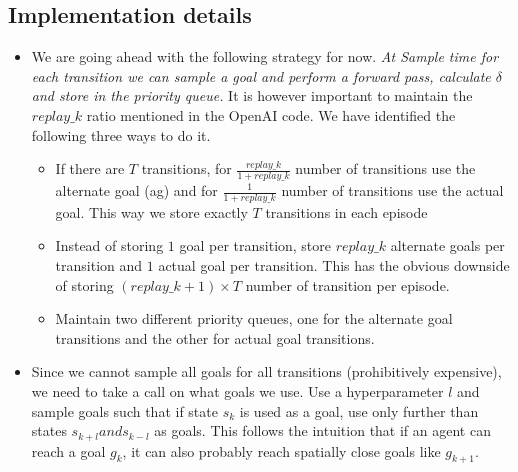 \documentclass[a4paper]{article}
\begin{document}
\subsection{Implementation details}
\begin{itemize}
	\item We are going ahead with the following strategy for now. \textit{At Sample time for each transition we can sample a goal and perform a forward pass, calculate $\delta$ and store in the priority queue.} It is however important to maintain the $replay\_k$ ratio mentioned in the OpenAI code. We have identified the following three ways to do it.
    \begin{itemize}
	\item If there are $T$ transitions, for $\frac{replay\_k}{1+replay\_k}$ number of transitions use the alternate goal (ag) and for $\frac{1}{1+replay\_k}$ number of transitions use the actual goal. This way we store exactly $T$ transitions in each episode
    \item Instead of storing $1$ goal per transition, store $replay\_k$ alternate goals per transition and $1$ actual goal per transition. This has the obvious downside of storing $(replay\_k+1)\times T$ number of transition per episode.
    \item Maintain two different priority queues, one for the alternate goal transitions and the other for actual goal transitions.
    
    \end{itemize}
    
    \item Since we cannot sample all goals for all transitions (prohibitively expensive), we need to take a call on what goals we use. Use a hyperparameter $l$ and sample goals such that if state $s_k$ is used as a goal, use only further than states $s_{k+l} and s_{k-l}$ as goals. This follows the intuition that if an agent can reach a goal $g_k$, it can also probably reach spatially close goals like $g_{k+1}$.
    
  
\end{itemize}
\end{document}
